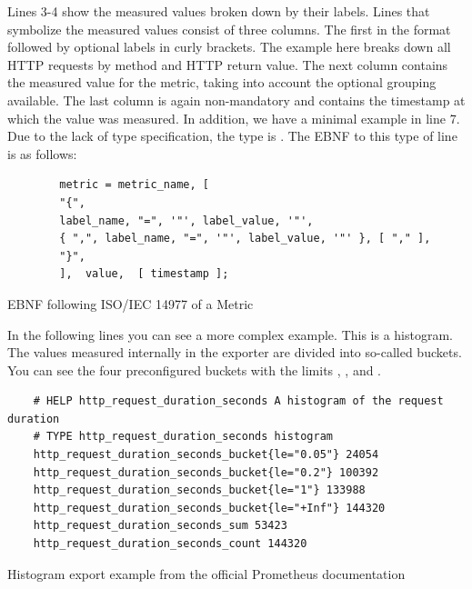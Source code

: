 Lines 3-4 show the measured values broken down by their labels. Lines that symbolize the measured values consist of three columns. The first in the format  followed by optional labels in curly brackets. The example here breaks down all HTTP requests by method and HTTP return value. The next column contains the measured value for the metric, taking into account the optional grouping available. The last column is again non-mandatory and contains the timestamp at which the value was measured. 
In addition, we have a minimal example in line 7. Due to the lack of type specification, the type is . The EBNF to this type of line is as follows:
\begin{listing}[H]
	\begin{samepage}
		\begin{verbatim}
		metric = metric_name, [ 
		"{",
		label_name, "=", '"', label_value, '"',
		{ ",", label_name, "=", '"', label_value, '"' }, [ "," ], 
		"}",
		],  value,  [ timestamp ];
		\end{verbatim}
		\caption{EBNF following ISO/IEC 14977 of a Metric}
	\end{samepage}
\end{listing}

In the following lines you can see a more complex example. This is a histogram. The values measured internally in the exporter are divided into so-called buckets. You can see the four preconfigured buckets with the limits , ,  and . 
\begin{listing}[H]
	\begin{verbatim}
	# HELP http_request_duration_seconds A histogram of the request duration
	# TYPE http_request_duration_seconds histogram
	http_request_duration_seconds_bucket{le="0.05"} 24054
	http_request_duration_seconds_bucket{le="0.2"} 100392
	http_request_duration_seconds_bucket{le="1"} 133988
	http_request_duration_seconds_bucket{le="+Inf"} 144320
	http_request_duration_seconds_sum 53423
	http_request_duration_seconds_count 144320
	\end{verbatim}
	\caption{Histogram export example from the official Prometheus documentation~\cite{PrometheusExpositionFormatBeispiel}}
\end{listing}

